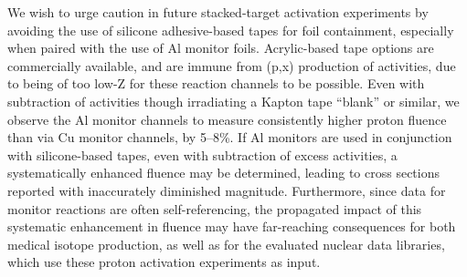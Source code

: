 \documentclass[3p]{elsarticle}
\newcommand{\comment}[1]{\todo[color=blue!20!white,inline]{ASV: #1}}
\begin{document}
% 
% 
% 
% 
% 
% 
% 





We wish to urge caution in future stacked-target activation experiments by avoiding the use of silicone adhesive-based tapes for foil containment, especially when paired with the use of Al monitor foils.
Acrylic-based tape options are commercially available, and are immune from (p,x) production of  activities, due to being of too low-Z for these reaction channels to be possible.
Even with subtraction of  activities though irradiating a Kapton tape \enquote{blank} or similar, we observe the Al monitor channels to measure consistently higher proton fluence than via Cu monitor channels, by 5--8\%. 
If Al monitors are used in conjunction with silicone-based tapes, even with subtraction of excess  activities, a systematically enhanced fluence may be determined, leading to cross sections reported with inaccurately diminished magnitude.
Furthermore, since data for monitor reactions are often self-referencing, the propagated impact of this systematic enhancement in fluence may have far-reaching consequences for both medical isotope production, as well as for  the evaluated nuclear data libraries, which use these proton activation experiments as input.

% 
\end{document}
